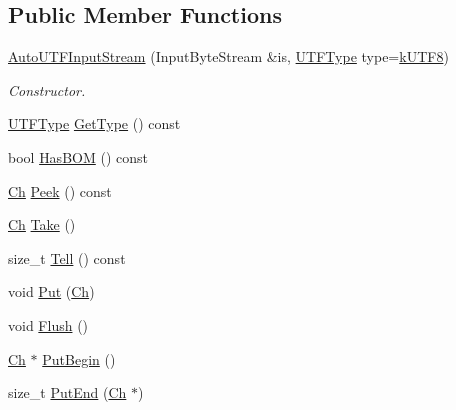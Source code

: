 \subsection*{Public Member Functions}
\begin{DoxyCompactItemize}
\item 
\mbox{\hyperlink{classrapidjson_1_1_auto_u_t_f_input_stream_a5c9f041a3b32bf15bc9be888a8731d35}{Auto\+U\+T\+F\+Input\+Stream}} (Input\+Byte\+Stream \&is, \mbox{\hyperlink{namespacerapidjson_a4aacabc0f8cea1cd628f466d890773eb}{U\+T\+F\+Type}} type=\mbox{\hyperlink{namespacerapidjson_a4aacabc0f8cea1cd628f466d890773eba3bda3a2e3f0ec2b7e8c5a3d5d4f60a81}{k\+U\+T\+F8}})
\begin{DoxyCompactList}\small\item\em Constructor. \end{DoxyCompactList}\item 
\mbox{\hyperlink{namespacerapidjson_a4aacabc0f8cea1cd628f466d890773eb}{U\+T\+F\+Type}} \mbox{\hyperlink{classrapidjson_1_1_auto_u_t_f_input_stream_a3666311c98787d9ed61b9fed2f3ac983}{Get\+Type}} () const
\item 
bool \mbox{\hyperlink{classrapidjson_1_1_auto_u_t_f_input_stream_a9934b27779fad9e36e6a85cbbaf21877}{Has\+B\+OM}} () const
\item 
\mbox{\hyperlink{classrapidjson_1_1_auto_u_t_f_input_stream_a6d9eca095f7ef8c249ebe43568d66d0e}{Ch}} \mbox{\hyperlink{classrapidjson_1_1_auto_u_t_f_input_stream_a6c5f36399d52fdc8230c25e092d4c357}{Peek}} () const
\item 
\mbox{\hyperlink{classrapidjson_1_1_auto_u_t_f_input_stream_a6d9eca095f7ef8c249ebe43568d66d0e}{Ch}} \mbox{\hyperlink{classrapidjson_1_1_auto_u_t_f_input_stream_abd4074558faa530f19aeeca6339e58e4}{Take}} ()
\item 
size\+\_\+t \mbox{\hyperlink{classrapidjson_1_1_auto_u_t_f_input_stream_a1e9b3e74895d28625fd184cf8897ed18}{Tell}} () const
\item 
void \mbox{\hyperlink{classrapidjson_1_1_auto_u_t_f_input_stream_a407d1e2e7db6a547833e6b0a44162b6e}{Put}} (\mbox{\hyperlink{classrapidjson_1_1_auto_u_t_f_input_stream_a6d9eca095f7ef8c249ebe43568d66d0e}{Ch}})
\item 
void \mbox{\hyperlink{classrapidjson_1_1_auto_u_t_f_input_stream_ad148d858b28b501d16d68b5e5af8602e}{Flush}} ()
\item 
\mbox{\hyperlink{classrapidjson_1_1_auto_u_t_f_input_stream_a6d9eca095f7ef8c249ebe43568d66d0e}{Ch}} $\ast$ \mbox{\hyperlink{classrapidjson_1_1_auto_u_t_f_input_stream_ae2706e06ffd8666c40c3a51705eef76c}{Put\+Begin}} ()
\item 
size\+\_\+t \mbox{\hyperlink{classrapidjson_1_1_auto_u_t_f_input_stream_aebead5efecdc51ffd78d95ca6ca1e07b}{Put\+End}} (\mbox{\hyperlink{classrapidjson_1_1_auto_u_t_f_input_stream_a6d9eca095f7ef8c249ebe43568d66d0e}{Ch}} $\ast$)
\end{DoxyCompactItemize}
